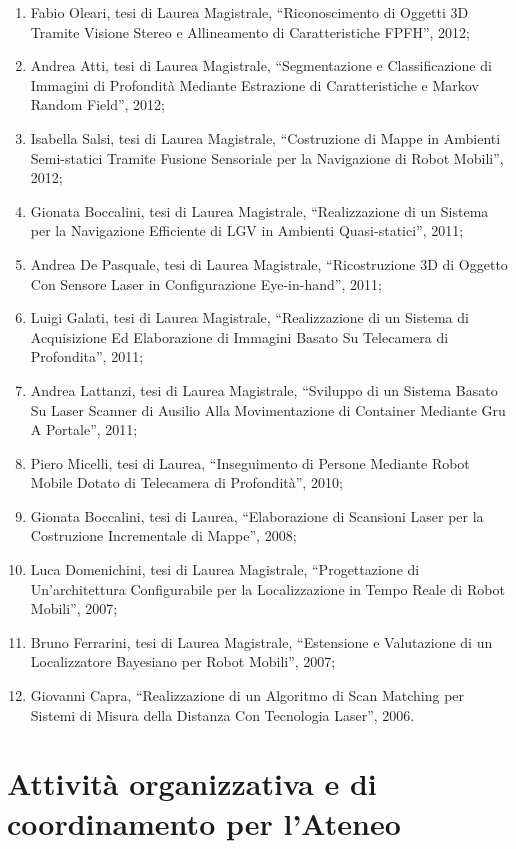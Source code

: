 \documentclass[11pt]{article}
\begin{document}
\begin{itemize}
\begin{enumerate}
%
\item Fabio Oleari, tesi di Laurea Magistrale, ``Riconoscimento di Oggetti 3D Tramite Visione Stereo e Allineamento di Caratteristiche FPFH'', 2012;
\item Andrea Atti, tesi di Laurea Magistrale, ``Segmentazione e Classificazione di Immagini di Profondit\`a Mediante Estrazione di Caratteristiche e Markov Random Field'', 2012;
\item Isabella Salsi, tesi di Laurea Magistrale, ``Costruzione di Mappe in Ambienti Semi-statici Tramite Fusione Sensoriale per la Navigazione di Robot Mobili'', 2012;
%
\item Gionata Boccalini, tesi di Laurea Magistrale, ``Realizzazione di un Sistema per la Navigazione Efficiente di LGV in Ambienti Quasi-statici'', 2011;
\item Andrea De Pasquale, tesi di Laurea Magistrale, ``Ricostruzione 3D di Oggetto Con Sensore Laser in Configurazione Eye-in-hand'', 2011;
\item Luigi Galati, tesi di Laurea Magistrale, ``Realizzazione di un Sistema di Acquisizione Ed Elaborazione di Immagini Basato Su Telecamera di Profondita'', 2011;
\item Andrea Lattanzi, tesi di Laurea Magistrale, ``Sviluppo di un Sistema Basato Su Laser Scanner di Ausilio Alla Movimentazione di Container Mediante Gru A Portale'', 2011; 
%
\item Piero Micelli, tesi di Laurea, ``Inseguimento di Persone Mediante Robot Mobile Dotato di Telecamera di Profondit\`a'', 2010;
%
\item Gionata Boccalini, tesi di Laurea, ``Elaborazione di Scansioni Laser per la Costruzione Incrementale di Mappe'', 2008;
%
\item Luca Domenichini, tesi di Laurea Magistrale, ``Progettazione di Un’architettura Configurabile per la Localizzazione in Tempo Reale di Robot Mobili'', 2007;
\item Bruno Ferrarini, tesi di Laurea Magistrale, ``Estensione e Valutazione di un Localizzatore Bayesiano per Robot Mobili'', 2007;
%
\item Giovanni Capra, ``Realizzazione di un Algoritmo di Scan Matching per Sistemi di Misura della  Distanza Con Tecnologia Laser'', 2006. 
\end{enumerate}


\section{Attivit\`a organizzativa e di coordinamento per l'Ateneo}


\end{itemize}
\end{document}
